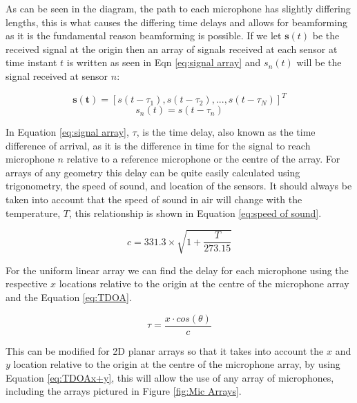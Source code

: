 \documentclass{UoNMCHA}
\numberwithin{equation}{section}
\begin{document}
    As can be seen in the diagram, the path to each microphone has slightly differing lengths, this is what causes the differing time delays and allows for beamforming as it is the fundamental reason beamforming is possible. If we let $\mathbf{s}(t)$ be the received signal at the origin then an array of signals received at each sensor at time instant $t$ is written as seen in Eqn \ref{eq:signal array} and $s_n(t)$ will be the signal received at sensor $n$:
    
    \begin{equation}
        \mathbf{s{(t)}} = [s(t-\tau_1), s(t-\tau_2), ..., s(t-\tau_N)]^T
        \label{eq:signal array}
    \end{equation}
    \begin{equation}
        s_n(t) = s(t-\tau_n)
        \label{eq:sensor signal}
    \end{equation}
    
    In Equation \ref{eq:signal array}, $\tau$, is the time delay, also known as the time difference of arrival, as it is the difference in time for the signal to reach microphone $n$ relative to a reference microphone or the centre of the array. For arrays of any geometry this delay can be quite easily calculated using trigonometry, the speed of sound, and location of the sensors. It should always be taken into account that the speed of sound in air will change with the temperature, $T$, this relationship is shown in Equation \ref{eq:speed of sound}. 
    
    \begin{equation}
        c = 331.3 \times \sqrt{1+\frac{T}{273.15}}
        \label{eq:speed of sound}
    \end{equation}
    
    For the uniform linear array we can find the delay for each microphone using the respective $x$ locations relative to the origin at the centre of the microphone array and the Equation \ref{eq:TDOA}.
    
    \begin{equation}
        \tau = \frac{x\cdot cos(\theta)}{c}
        \label{eq:TDOA}
    \end{equation}
    
    This can be modified for 2D planar arrays so that it takes into account the $x$ and $y$ location  relative to the origin at the centre of the microphone array, by using Equation \ref{eq:TDOAx+y}, this will allow the use of any array of microphones, including the arrays pictured in Figure \ref{fig:Mic Arrays}.
    
\end{document}
